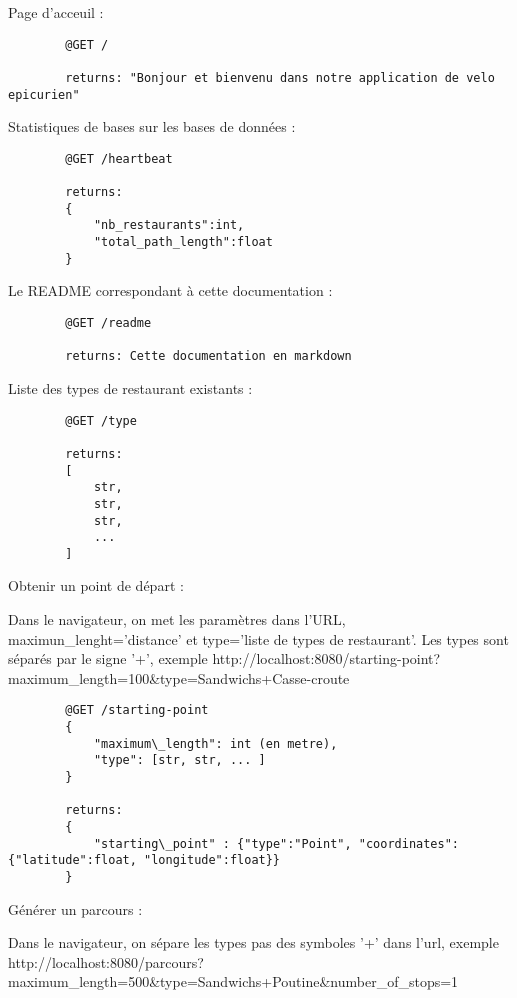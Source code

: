 \documentclass[11pt,a4paper]{article}
\begin{document}
    Page d'acceuil :

    \begin{lstlisting}
        @GET /

        returns: "Bonjour et bienvenu dans notre application de velo epicurien"
    \end{lstlisting}

    Statistiques de bases sur les bases de données :

    \begin{lstlisting}
        @GET /heartbeat

        returns:
        {
            "nb_restaurants":int,
            "total_path_length":float
        }
    \end{lstlisting}

    Le README correspondant à cette documentation :

    \begin{lstlisting}
        @GET /readme
        
        returns: Cette documentation en markdown
    \end{lstlisting}

    Liste des types de restaurant existants :
    
    \begin{lstlisting}
        @GET /type

        returns:
        [
            str,
            str,
            str,
            ...
        ]
    \end{lstlisting}

    Obtenir un point de départ : 

    Dans le navigateur, on met les paramètres dans l'URL, maximun\_lenght='distance' et type='liste de types de restaurant'. Les types sont séparés par le signe '+', exemple http://localhost:8080/starting-point?maximum\_length=100\&type=Sandwichs+Casse-croute

    \begin{lstlisting}
        @GET /starting-point
        {
            "maximum\_length": int (en metre),
            "type": [str, str, ... ]
        }

        returns:
        {
            "starting\_point" : {"type":"Point", "coordinates":{"latitude":float, "longitude":float}}
        }
    \end{lstlisting}


    Générer un parcours :
    
    Dans le navigateur, on sépare les types pas des symboles '+' dans l'url, exemple http://localhost:8080/parcours?maximum\_length=500\&type=Sandwichs+Poutine\&number\_of\_stops=1
        
\end{document}
